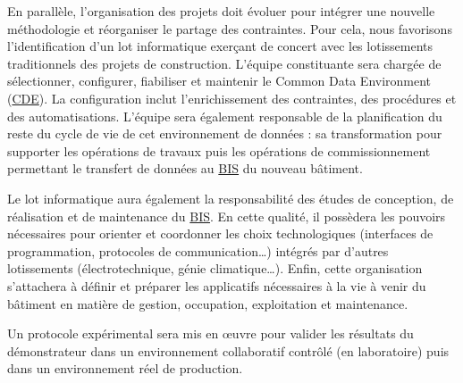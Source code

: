 \documentclass[a4paper,12pt]{article}
\begin{document}
En parallèle, l’organisation des projets doit évoluer pour intégrer une nouvelle méthodologie et réorganiser le partage des contraintes. Pour cela, nous favorisons l’identification d’un lot informatique exerçant de concert avec les lotissements traditionnels des projets de construction. L’équipe constituante sera chargée de sélectionner, configurer, fiabiliser et maintenir le Common Data Environment
 (\protect\hyperlink{gls-17}{\label{gls-17-use-1}CDE}). La configuration inclut l’enrichissement des contraintes, des procédures et des automatisations. L’équipe sera également responsable de la planification du reste du cycle de vie de cet environnement de données : sa transformation pour supporter les opérations de travaux puis les opérations de commissionnement permettant le transfert de données au \protect\hyperlink{gls-4}{\label{gls-4-use-3}BIS} du nouveau bâtiment. 

Le lot informatique aura également la responsabilité des études de conception, de réalisation et de maintenance du \protect\hyperlink{gls-4}{\label{gls-4-use-4}BIS}. En cette qualité, il possèdera les pouvoirs nécessaires pour orienter et coordonner les choix technologiques (interfaces de programmation, protocoles de communication…) intégrés par d’autres lotissements (électrotechnique, génie climatique…). Enfin, cette organisation s’attachera à définir et préparer les applicatifs nécessaires à la vie à venir du bâtiment en matière de gestion, occupation, exploitation et maintenance. 

Un protocole expérimental sera mis en œuvre pour valider les résultats du démonstrateur dans un environnement collaboratif contrôlé (en laboratoire) puis dans un environnement réel de production.
\end{document}
